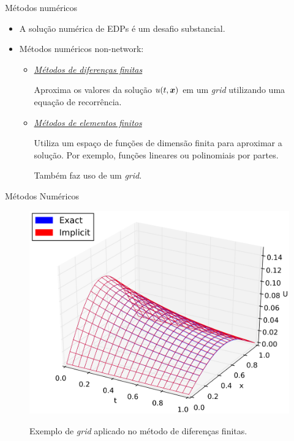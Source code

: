 \documentclass[13pt]{beamer}
\begin{document}
\begin{frame}{Métodos numéricos}
    \begin{itemize}
        \item<1-> A solução numérica de EDPs é um desafio substancial.
        \item<2-> Métodos numéricos non-network:
        \begin{itemize}
            \item<3-> \href{https://en.wikipedia.org/wiki/Finite_difference_method}{\emph{Métodos de diferenças finitas}}

                Aproxima os valores da solução \( u ( t, \bm{x} ) \) em um \emph{grid} utilizando uma equação de recorrência.

                \item<5-> \href{https://en.wikipedia.org/wiki/Finite_element_method}{\emph{Métodos de elementos finitos}}

                Utiliza um espaço de funções de dimensão finita para aproximar a solução.
                Por exemplo, funções lineares ou polinomiais por partes.

                Também faz uso de um \emph{grid}.
        \end{itemize}
    \end{itemize}
\end{frame}

\begin{frame}{Métodos Numéricos}
    \begin{figure}
        \begin{center}
            \includegraphics[width=.6\textwidth]{../figuras/fd-grid.png}
        \end{center}
        Exemplo de \emph{grid} aplicado no método de diferenças finitas.
    \end{figure}
\end{frame}
\end{document}
